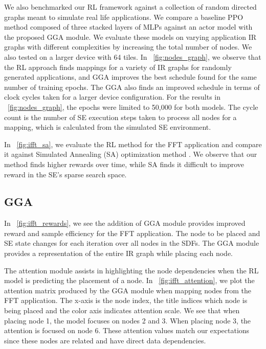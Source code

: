 We also benchmarked our RL framework against a collection of random directed graphs meant to simulate real life applications.
We compare a baseline PPO method composed of three stacked layers of MLPs against an actor model with the proposed GGA module.
We evaluate these models on varying application IR graphs with different complexities by increasing the total number of nodes.
We also tested on a larger device with 64 tiles.
In \figurename~\ref{fig:nodes_graph}, we observe that the RL approach finds mappings for a variety of IR graphs for randomly generated applications, and GGA improves the best schedule found for the same number of training epochs.
The GGA also finds an improved schedule in terms of clock cycles taken for a larger device configuration.
For the results in \figurename~\ref{fig:nodes_graph}, the epochs were limited to 50,000 for both models.
The cycle count is the number of SE execution steps taken to process all nodes for a mapping, which is calculated from the simulated SE environment.

In \figurename~\ref{fig:ifft_sa}, we evaluate the RL method for the FFT application and compare it against Simulated Annealing (SA) optimization method \cite{kirkpatrick1983optimization}.
We observe that our method finds higher rewards over time, while SA finds it difficult to improve reward in the SE's sparse search space.

\subsection{GGA} \label{sec:GGA_result}

In \figurename~\ref{fig:ifft_rewards}, we see the addition of GGA module provides improved reward and sample efficiency for the FFT application.
The node to be placed and SE state changes for each iteration over all nodes in the SDFs. The GGA module provides a representation of the entire IR graph while placing each node.

The attention module assists in highlighting the node dependencies when the RL model is predicting the placement of a node.
In \figurename~\ref{fig:ifft_attention}, we plot the attention matrix produced by the GGA module when mapping nodes from the FFT application.
The x-axis is the node index, the title indices which node is being placed and the color axis indicates attention scale.
We see that when placing node 1, the model focuses on nodes 2 and 3. When placing node 3, the attention is focused on node 6.
These attention values match our expectations since these nodes are related and have direct data dependencies.


